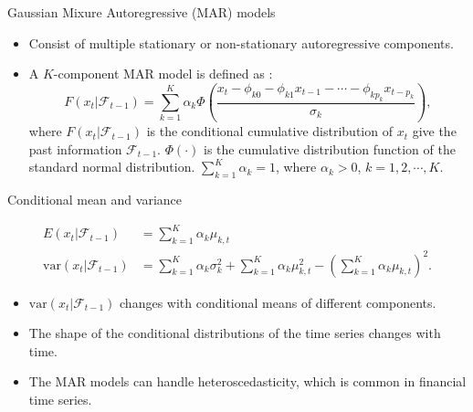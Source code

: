 \documentclass[11pt,ignorenonframetext,compress]{beamer}
\providecommand{\tightlist}{%
  \setlength{\itemsep}{0pt}\setlength{\parskip}{0pt}}
\begin{document}
\begin{frame}{Gaussian Mixure Autoregressive (MAR) models}

  \begin{itemize}
    \tightlist
  \item
    Consist of multiple stationary or non-stationary autoregressive
    components.\\
  \item
    A \(K\)-component MAR model is defined as \citep{wong2000mixture} : \[
      F(x_t|\mathcal{F}_{t-1}) =
      \sum\limits_{k=1}^K\alpha_k\Phi(\frac{x_t-\phi_{k0}-\phi_{k1}x_{t-1}-\cdots
        -\phi_{kp_k}x_{t-p_k}}{\sigma_k}),
    \] where \(F(x_t|\mathcal{F}_{t-1})\) is the conditional cumulative
    distribution of \(x_t\) give the past information
    \(\mathcal{F}_{t-1}\). \(\Phi(\cdot)\) is the cumulative distribution
    function of the standard normal distribution.
    \(\sum_{k=1}^K \alpha_k= 1\), where \(\alpha_k > 0\),
    \(k = 1, 2, \cdots, K\).
  \end{itemize}

\end{frame}

\begin{frame}{Conditional mean and variance}

  \begin{align*}
    E(x_t|\mathcal{F}_{t-1}) &= \sum\limits_{k=1}^K\alpha_k \mu_{k, t}\\
    \mathrm{var}(x_t|\mathcal{F}_{t-1}) &= \sum\limits_{k=1}^K\alpha_k \sigma_k^2 +
                                          \sum\limits_{k=1}^K\alpha_k \mu_{k, t}^2 - \left(\sum\limits_{k=1}^K\alpha_k
                                          \mu_{k, t}\right)^2.
  \end{align*}

  \begin{itemize}
    \tightlist
  \item
    \(\mathrm{var}(x_t|\mathcal{F}_{t-1})\) changes with conditional means
    of different components.
  \item
    The shape of the conditional distributions of the time series changes
    with time.
  \item
    The MAR models can handle heteroscedasticity, which is common in
    financial time series.
  \end{itemize}

\end{frame}
\end{document}
